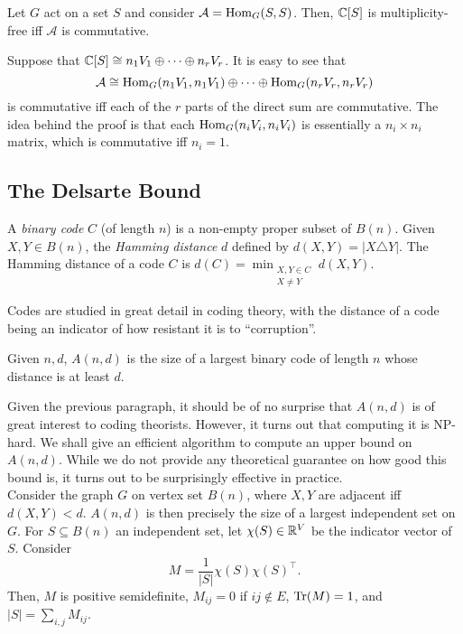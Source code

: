 	\begin{flem}
		\label{lem:multiplicity-free}
		Let $G$ act on a set $S$ and consider $\mathcal{A} = \operatorname{Hom}_G(S,S)$. Then, $\mathbb{C}[S]$ is multiplicity-free iff $\mathcal{A}$ is commutative.
	\end{flem}
	Suppose that $\mathbb{C}[S] \cong n_1 V_1 \oplus \cdots \oplus n_r V_r$. It is easy to see that
	\[ \mathcal{A} \cong \operatorname{Hom}_G(n_1 V_1, n_1 V_1) \oplus \cdots \oplus \operatorname{Hom}_G(n_r V_r, n_r V_r) \]
	is commutative iff each of the $r$ parts of the direct sum are commutative. The idea behind the proof is that each $\operatorname{Hom}_G(n_i V_i, n_i V_i)$ is essentially a $n_i \times n_i$ matrix, which is commutative iff $n_i = 1$.

\subsection{The Delsarte Bound}
\label{subsec:delsarte}

	\begin{fdef}
		A \emph{binary code} $C$ (of length $n$) is a non-empty proper subset of $B(n)$. Given $X,Y \in B(n)$, the \emph{Hamming distance} $d$ defined by $d(X,Y) = |X \triangle Y|$. The Hamming distance of a code $C$ is $d(C) = \min_{\substack{X,Y \in C \\ X \ne Y}} d(X,Y)$.
	\end{fdef}

	Codes are studied in great detail in coding theory, with the distance of a code being an indicator of how resistant it is to ``corruption''.

	\begin{fdef}
		Given $n,d$, $A(n,d)$ is the size of a largest binary code of length $n$ whose distance is at least $d$.
	\end{fdef}

	Given the previous paragraph, it should be of no surprise that $A(n,d)$ is of great interest to coding theorists. However, it turns out that computing it is \textsf{NP}-hard. We shall give an efficient algorithm to compute an upper bound on $A(n,d)$. While we do not provide any theoretical guarantee on how good this bound is, it turns out to be surprisingly effective in practice.\\

	Consider the graph $G$ on vertex set $B(n)$, where $X,Y$ are adjacent iff $d(X,Y) < d$. $A(n,d)$ is then precisely the size of a largest independent set on $G$. For $S \subseteq B(n)$ an independent set, let $\chi(S) \in \mathbb{R}^V$ be the indicator vector of $S$. Consider
	\[ M = \frac{1}{|S|} \chi(S) \chi(S)^\top. \]
	Then, $M$ is positive semidefinite, $M_{ij} = 0$ if $ij \not\in E$, $\operatorname{Tr}(M) = 1$, and $|S| = \sum_{i,j} M_{ij}$.

